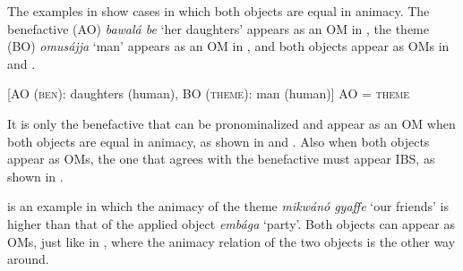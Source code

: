 \documentclass[output=paper,
            colorlinks, citecolor=brown
            ,draftmode
		  ]{langscibook}
\begin{document}
    The examples in  show cases in which both objects are equal in animacy. The benefactive (AO) \textit{bawalá be} ‘her daughters’ appears as an OM in , the theme (BO) \textit{omusájja} ‘man’ appears as an OM in , and both objects appear as OMs in  and .

\ea%
    \label{ex:yoneda:33}
    [AO (\textsc{ben}): daughters (human), BO (\textsc{theme}): man (human)]  AO = \textsc{theme} 
    \z
\z



    It is only the benefactive that can be pronominalized and appear as an OM when both objects are equal in animacy, as shown in  and . Also when both objects appear as OMs, the one that agrees with the benefactive must appear IBS, as shown in .     


     is an example in which the animacy of the theme \textit{mikwánó gyaffe} ‘our friends’ is higher than that of the applied object \textit{embága} ‘party’. Both objects can appear as OMs, just like in , where the animacy relation of the two objects is the other way around. 
\end{document}
